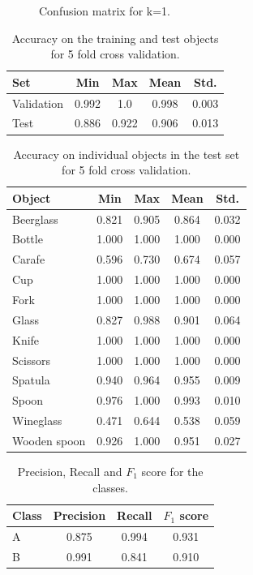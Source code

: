 \begin{figure}
	
	\caption{Confusion matrix for k=1.}
	\label{fig:confusion_matrix}
\end{figure}

\begin{table}
	\centering
	\begin{tabular}{l | c | c | c | c}
		\hline
		Set        & Min   & Max   & Mean  & Std.  \\ \hline
		Validation & 0.992 & 1.0   & 0.998 & 0.003 \\
		Test       & 0.886 & 0.922 & 0.906 & 0.013 \\
		\hline
	\end{tabular}
	\caption{Accuracy on the training and test objects for 5 fold cross validation.}
	\label{tab:results_accuracy}
\end{table}

\begin{table}
	\centering
	\begin{tabular}{l | c | c | c | c}
		\hline
		Object       & Min   & Max   & Mean  & Std.  \\ \hline
		Beerglass    & 0.821 & 0.905 & 0.864 & 0.032 \\
		Bottle       & 1.000 & 1.000 & 1.000 & 0.000 \\
		Carafe       & 0.596 & 0.730 & 0.674 & 0.057 \\
		Cup          & 1.000 & 1.000 & 1.000 & 0.000 \\
		Fork         & 1.000 & 1.000 & 1.000 & 0.000 \\
		Glass        & 0.827 & 0.988 & 0.901 & 0.064 \\
		Knife        & 1.000 & 1.000 & 1.000 & 0.000 \\
		Scissors     & 1.000 & 1.000 & 1.000 & 0.000 \\
		Spatula      & 0.940 & 0.964 & 0.955 & 0.009 \\
		Spoon        & 0.976 & 1.000 & 0.993 & 0.010 \\
		Wineglass    & 0.471 & 0.644 & 0.538 & 0.059 \\
		Wooden spoon & 0.926 & 1.000 & 0.951 & 0.027 \\
		\hline
	\end{tabular}
	\caption{Accuracy on individual objects in the test set for 5 fold cross validation.}
	\label{tab:results}
\end{table}

\begin{table}
	\centering
	\begin{tabular}{l | c | c | c}
		\hline
		Class & Precision & Recall & \(F_1\) score \\ \hline
		A     & 0.875     & 0.994  & 0.931 \\
		B     & 0.991     & 0.841  & 0.910 \\ \hline
	\end{tabular}
	\caption{Precision, Recall and \(F_1\) score for the classes.}
	\label{tab:results_precision_recall_f1}
\end{table}


